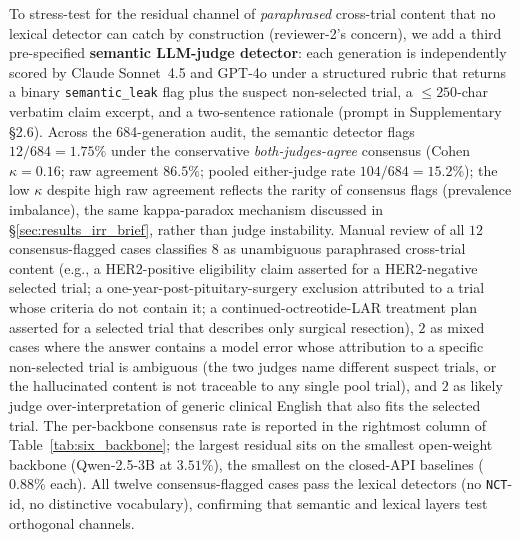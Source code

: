\documentclass[11pt]{article}
\begin{document}
To stress-test for the residual channel of \emph{paraphrased} cross-trial content that no lexical detector can catch by construction (reviewer-2's concern), we add a third pre-specified \textbf{semantic LLM-judge detector}: each generation is independently scored by Claude Sonnet~4.5 and GPT-4o under a structured rubric that returns a binary \texttt{semantic\_leak} flag plus the suspect non-selected trial, a $\leq 250$-char verbatim claim excerpt, and a two-sentence rationale (prompt in Supplementary \S2.6). Across the 684-generation audit, the semantic detector flags $12/684 = 1.75\%$ under the conservative \emph{both-judges-agree} consensus (Cohen $\kappa = 0.16$; raw agreement $86.5\%$; pooled either-judge rate $104/684 = 15.2\%$); the low $\kappa$ despite high raw agreement reflects the rarity of consensus flags (prevalence imbalance), the same kappa-paradox mechanism discussed in \S\ref{sec:results_irr_brief}, rather than judge instability. Manual review of all $12$ consensus-flagged cases classifies $8$ as unambiguous paraphrased cross-trial content (e.g., a HER2-positive eligibility claim asserted for a HER2-negative selected trial; a one-year-post-pituitary-surgery exclusion attributed to a trial whose criteria do not contain it; a continued-octreotide-LAR treatment plan asserted for a selected trial that describes only surgical resection), $2$ as mixed cases where the answer contains a model error whose attribution to a specific non-selected trial is ambiguous (the two judges name different suspect trials, or the hallucinated content is not traceable to any single pool trial), and $2$ as likely judge over-interpretation of generic clinical English that also fits the selected trial. The per-backbone consensus rate is reported in the rightmost column of Table~\ref{tab:six_backbone}; the largest residual sits on the smallest open-weight backbone (Qwen-2.5-3B at $3.51\%$), the smallest on the closed-API baselines ($0.88\%$ each). All twelve consensus-flagged cases pass the lexical detectors (no \texttt{NCT}-id, no distinctive vocabulary), confirming that semantic and lexical layers test orthogonal channels.
\end{document}

